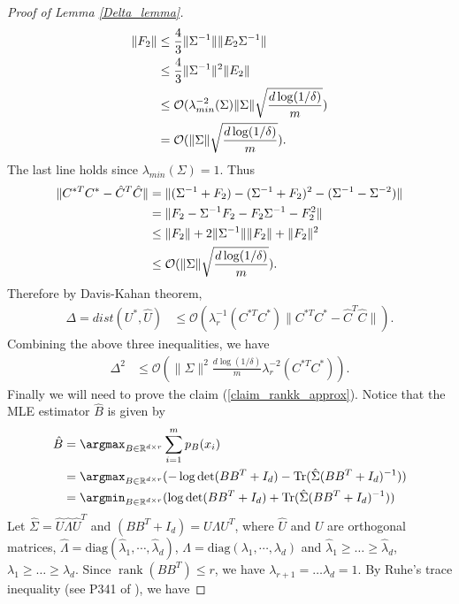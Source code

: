 \begin{proof}[Proof of Lemma \ref{Delta_lemma}]
\begin{align}
\|F_{2}\| &\leq \frac{4}{3}    \|\Sigma^{-1}\| \|E_{2}\Sigma^{-1}\| \notag \\
& \leq \frac{4}{3}    \|\Sigma^{-1}\|^{2} \|E_{2}\| \notag \\
&\leq \mathcal{O}(\lambda_{min}^{-2}(\Sigma)\|\Sigma\|\sqrt{\frac{d \log (1/\delta)}{m}}) \notag \\
&= \mathcal{O}(\|\Sigma\|\sqrt{\frac{d \log (1/\delta)}{m}}).
\end{align}
The last line holds since $\lambda_{min}(\Sigma)=1$.
Thus 
\begin{align}
\|C^{* T}C^{*}- \hat{C}^{T}\hat{C}\| &= \|(\Sigma^{-1}+F_{2})-(\Sigma^{-1}+F_{2})^{2} - (\Sigma^{-1}-\Sigma^{-2})\| \notag \\
&= \|F_{2}- \Sigma^{-1}F_{2}-F_{2}\Sigma^{-1} - F_{2}^{2}\| \notag \\
& \leq \|F_{2}\| + 2\|\Sigma^{-1}\|\|F_{2}\| + \|F_{2}\|^{2} \notag \\
& \leq \mathcal{O}(\|\Sigma\|\sqrt{\frac{d \log (1/\delta)}{m}}).
\end{align}
Therefore by Davis-Kahan theorem, 
\begin{align}
\Delta = dist (U^{*},\hat{U}) &\leq \mathcal{O} (\lambda_{r}^{-1}(C^{* T}C^{*})\|C^{* T}C^{*}- \hat{C}^{T}\hat{C}\|).
\end{align}
Combining the above three inequalities, we have 
\begin{align}
\Delta^{2} &\leq \mathcal{O} (\|\Sigma\|^{2}\frac{d \log (1/\delta)}{m} \lambda_{r}^{-2}(C^{* T}C^{*})). 
\end{align}
Finally we will need to prove the claim (\ref{claim_rankk_approx}).
Notice that the MLE estimator $\hat{B}$ is given by 
\begin{align}
\hat{B} &= \argmax_{B\in \mathbb{R}^{d \times r}} \sum_{i=1}^{m}p_{B}(x_{i})    \notag \\
& =  \argmax_{B\in \mathbb{R}^{d \times r}} (-\log \det (BB^{T}+I_{d})-\text{Tr}(\hat{\Sigma}(BB^{T}+I_{d})^{-1})) \notag \\
& = \argmin_{B\in \mathbb{R}^{d \times r}} (\log \det (BB^{T}+I_{d})+\text{Tr}(\hat{\Sigma}(BB^{T}+I_{d})^{-1}))
\end{align}
Let $\hat{\Sigma}=\hat U\hat{\Lambda}\hat{U}^{T}$ and  $(BB^{T}+I_{d})=U \Lambda U^{T}$, where $\hat U$ and $U$ are orthogonal matrices, $\hat{\Lambda}=\text{diag}(\hat{\lambda}_{1},\cdots, \hat{\lambda}_{d})$, $\Lambda=\text{diag}(\lambda_{1},\cdots, \lambda_{d})$ and $\hat\lambda_1\geq\ldots\geq\hat\lambda_d$, $\lambda_1\geq\ldots\geq\lambda_d$. Since $\operatorname{rank}(BB^T)\leq r$, we have $\lambda_{r+1}= \ldots \lambda_{d}=1$. By Ruhe’s trace inequality (see P341 of \citet{marshall11}), we have 

\end{proof}
